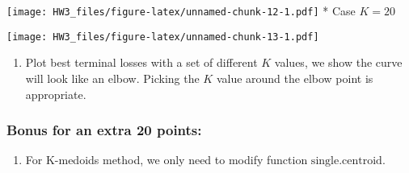 \documentclass[]{article}
\newenvironment{Shaded}{\begin{snugshade}}{\end{snugshade}}
\newcommand{\KeywordTok}[1]{\textcolor[rgb]{0.13,0.29,0.53}{\textbf{#1}}}
\newcommand{\DataTypeTok}[1]{\textcolor[rgb]{0.13,0.29,0.53}{#1}}
\newcommand{\DecValTok}[1]{\textcolor[rgb]{0.00,0.00,0.81}{#1}}
\newcommand{\StringTok}[1]{\textcolor[rgb]{0.31,0.60,0.02}{#1}}
\newcommand{\OperatorTok}[1]{\textcolor[rgb]{0.81,0.36,0.00}{\textbf{#1}}}
\newcommand{\NormalTok}[1]{#1}
\providecommand{\tightlist}{%
  \setlength{\itemsep}{0pt}\setlength{\parskip}{0pt}}
\begin{document}
\begin{Shaded}
\end{Shaded}

\texttt{[image: HW3\_files/figure-latex/unnamed-chunk-12-1.pdf]} * Case
\(K = 20\)

\begin{Shaded}
\end{Shaded}

\texttt{[image: HW3\_files/figure-latex/unnamed-chunk-13-1.pdf]}

\begin{enumerate}
\def\labelenumi{\arabic{enumi}.}
\setcounter{enumi}{5}
\tightlist
\item
  Plot best terminal losses with a set of different \(K\) values, we
  show the curve will look like an elbow. Picking the \(K\) value around
  the elbow point is appropriate.
\end{enumerate}

\subsubsection{Bonus for an extra 20
points:}\label{bonus-for-an-extra-20-points-1}

\begin{enumerate}
\def\labelenumi{\arabic{enumi}.}
\setcounter{enumi}{6}
\tightlist
\item
  For K-medoids method, we only need to modify function
  \(\textrm{single.centroid}\).
\end{enumerate}
\end{document}
